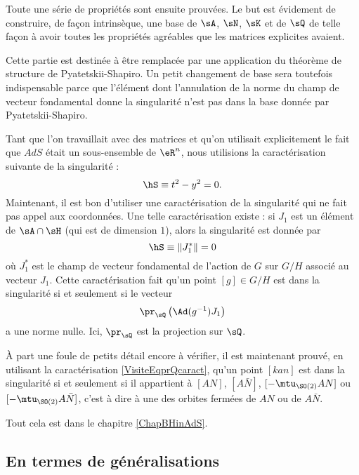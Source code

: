 Toute une série de propriétés sont ensuite prouvées. Le but est évidement de construire, de façon intrinsèque, une base de $\sA$, $\sN$, $\sK$ et de $\sQ$ de telle façon à avoir toutes les propriétés agréables que les matrices explicites avaient.

Cette partie est destinée à être remplacée par une application du théorème de structure de Pyatetskii-Shapiro. Un petit changement de base sera toutefois indispensable parce que l'élément dont l'annulation de la norme du champ de vecteur fondamental donne la singularité n'est pas dans la base donnée par Pyatetskii-Shapiro.

Tant que l'on travaillait avec des matrices et qu'on utilisait explicitement le fait que $AdS$ était un sous-ensemble de $\eR^n$, nous utilisions la caractérisation suivante de la singularité :
\begin{equation}
	\hS\equiv t^2-y^2=0.
\end{equation}
Maintenant, il est bon d'utiliser une caractérisation de la singularité qui ne fait pas appel aux coordonnées. Une telle caractérisation existe : si $J_1$ est un élément de $\sA\cap\sH$ (qui est de dimension $1$), alors la singularité est donnée par
\begin{equation}
	\hS\equiv \| J_1^* \|=0
\end{equation}
où $J_1^*$ est le champ de vecteur fondamental de l'action de $G$ sur $G/H$ associé au vecteur $J_1$. Cette caractérisation fait qu'un point $[g]\in G/H$ est dans la singularité si et seulement si le vecteur
\begin{equation}		\label{VisiteEqprQcaract}
	\pr_{\sQ}\left( \Ad(g^{-1})J_1 \right)
\end{equation}
a une norme nulle. Ici, $\pr_{\sQ}$ est la projection sur $\sQ$.

À part une foule de petits détail encore à vérifier, il est maintenant prouvé, en utilisant la caractérisation \eqref{VisiteEqprQcaract}, qu'un point $[kan]$ est dans la singularité si et seulement si il appartient à $[AN]$, $[A\bar N]$, $[-\mtu_{\SO(2)}AN]$ ou $[-\mtu_{\SO(2)}A\bar N]$, c'est à dire à une des orbites fermées de $AN$ ou de $A\bar N$.


Tout cela est dans le chapitre \ref{ChapBHinAdS}.

\subsection{En termes de généralisations}

